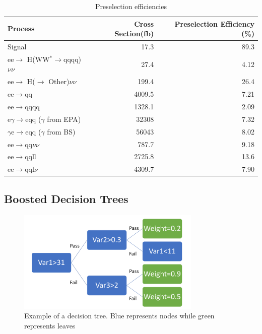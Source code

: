 \begin{table}
  \centering
  \begin{tabular}{l r r }
   \toprule
    Process & Cross Section(fb) & Preselection Efficiency (\%)     \\
    \midrule
    Signal             & 17.3    &   89.3 \\ 
    \midrule
    ee$\rightarrow$ H(WW$^*\rightarrow$qqqq)$\nu\nu$  & 27.4    &  4.12  \\
    \midrule
    ee$\rightarrow$ H($\rightarrow$ Other)$\nu\nu$ & 199.4 & 26.4  \\
    \midrule
    ee$\rightarrow$qq               & 4009.5    &  7.21 \\ 
    \midrule
    ee$\rightarrow$qqqq               & 1328.1    &  2.09  \\ 
    \midrule
    e$\gamma$$\rightarrow$eqq ($\gamma$ from EPA)                 & 32308    & 7.32   \\ 
    \midrule
    $\gamma$e$\rightarrow$eqq ($\gamma$ from BS)               &  56043   &  8.02 \\ 
    \midrule
    ee$\rightarrow$qq$\nu\nu$               & 787.7    & 9.18  \\ 
    \midrule
    ee$\rightarrow$qqll               & 2725.8    &   13.6 \\ 
    \midrule
    ee$\rightarrow$qql$\nu$              & 4309.7    &  7.90  \\ 
    \bottomrule
  \end{tabular}
  \caption[Preselection efficiencies]{Preselection efficiencies}
  \label{fig:preseleff}
\end{table}



\subsection{Boosted Decision Trees}

\begin{figure}
  \centering
  \includegraphics[width=0.78\textwidth,keepaspectratio]{HiggsAnalysis/figures/decisiontree}
  \caption[Example of a decision tree]{Example of a decision tree. Blue represents nodes while green represents leaves}
  \label{fig:decisiontree}
\end{figure}


